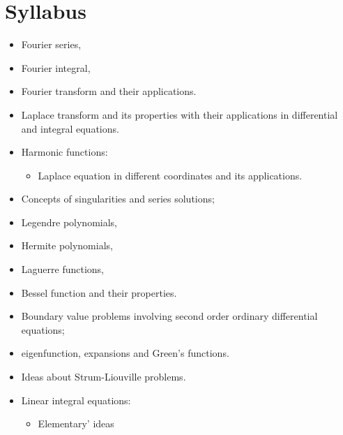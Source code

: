 \documentclass[../main-sheet.tex]{subfiles}
\begin{document}
\chapter*{Syllabus}
\begin{itemize}
    \item Fourier series,
    \item Fourier integral,
    \item Fourier transform and their applications.
    \item Laplace transform and its properties with their applications in differential and integral equations.
    \item Harmonic functions:
    \begin{itemize}
        \item Laplace equation in different coordinates and its applications.
    \end{itemize}
    \item Concepts of singularities and series solutions;
    \item Legendre polynomials,
    \item Hermite polynomials,
    \item Laguerre functions,
    \item Bessel function and their properties.
    \item Boundary value problems involving second order ordinary differential equations;
    \item eigenfunction, expansions and Green's functions.
    \item Ideas about Strum-Liouville problems.
    \item Linear integral equations:
    \begin{itemize}
        \item Elementary' ideas
    \end{itemize}
\end{itemize}
\end{document}

